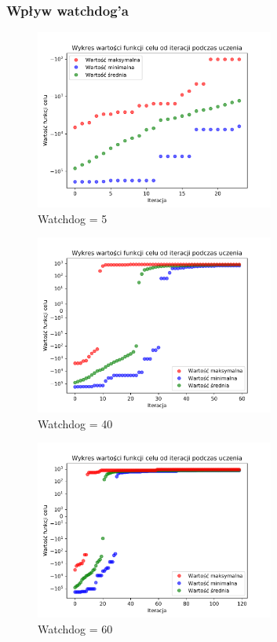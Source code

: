 \documentclass[a4paper]{article}
\begin{document}
\subsubsection{Wpływ watchdog'a}
\begin{figure}[H]
    \centering
    \includegraphics[width=0.7\textwidth]{plots/watchdog_05.pdf}
    \caption{Watchdog = 5}
    \label{fig:watchdog_05}
\end{figure}

\begin{figure}[H]
    \centering
    \includegraphics[width=0.7\textwidth]{plots/watchdog_40.pdf}
    \caption{Watchdog = 40}
    \label{fig:watchdog_40}
\end{figure}

\begin{figure}[H]
    \centering
    \includegraphics[width=0.7\textwidth]{plots/watchdog_60.pdf}
    \caption{Watchdog = 60}
    \label{fig:watchdog_60}
\end{figure}
\end{document}
